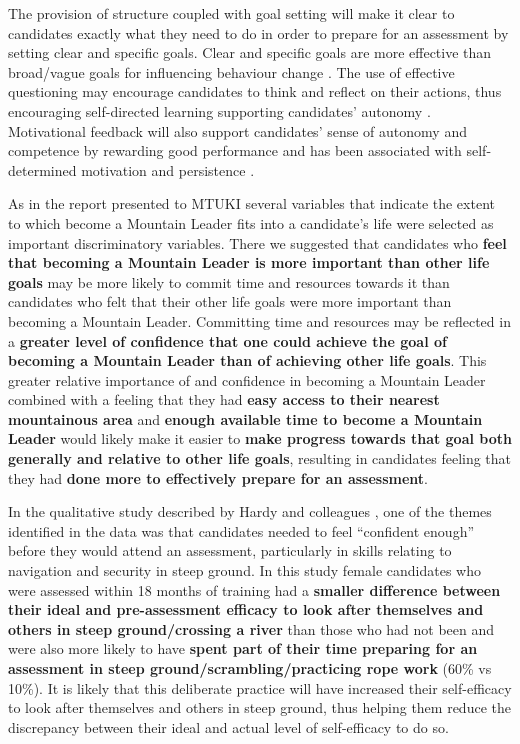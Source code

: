 \documentclass[
  12pt,
  a4paper,
]{book}
\begin{document}
The provision of structure coupled with goal setting will make it clear to candidates exactly what they need to do in order to prepare for an assessment by setting clear and specific goals. Clear and specific goals are more effective than broad/vague goals for influencing behaviour change \citep{Gould2005}. The use of effective questioning may encourage candidates to think and reflect on their actions, thus encouraging self-directed learning supporting candidates' autonomy \citep{Wagstaff2018}. Motivational feedback will also support candidates' sense of autonomy and competence by rewarding good performance and has been associated with self-determined motivation and persistence \citep{Reinboth2004, Wagstaff2018}.

As in the report presented to MTUKI \citep{Hardy2019b} several variables that indicate the extent to which become a Mountain Leader fits into a candidate's life were selected as important discriminatory variables. There we suggested that candidates who \textbf{feel that becoming a Mountain Leader is more important than other life goals} may be more likely to commit time and resources towards it than candidates who felt that their other life goals were more important than becoming a Mountain Leader. Committing time and resources may be reflected in a \textbf{greater level of confidence that one could achieve the goal of becoming a Mountain Leader than of achieving other life goals}. This greater relative importance of and confidence in becoming a Mountain Leader combined with a feeling that they had \textbf{easy access to their nearest mountainous area} and \textbf{enough available time to become a Mountain Leader} would likely make it easier to \textbf{make progress towards that goal both generally and relative to other life goals}, resulting in candidates feeling that they had \textbf{done more to effectively prepare for an assessment}.

In the qualitative study described by Hardy and colleagues \citeyearpar[ pg 10]{Hardy2019b}, one of the themes identified in the data was that candidates needed to feel ``confident enough'' before they would attend an assessment, particularly in skills relating to navigation and security in steep ground. In this study female candidates who were assessed within 18 months of training had a \textbf{smaller difference between their ideal and pre-assessment efficacy to look after themselves and others in steep ground/crossing a river} than those who had not been and were also more likely to have \textbf{spent part of their time preparing for an assessment in steep ground/scrambling/practicing rope work} (60\% vs 10\%). It is likely that this deliberate practice will have increased their self-efficacy to look after themselves and others in steep ground, thus helping them reduce the discrepancy between their ideal and actual level of self-efficacy to do so.
\end{document}
